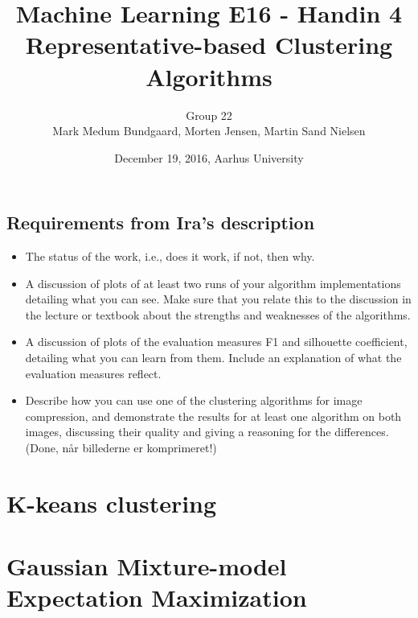 \documentclass[a4paper,10pt,article,oneside,english]{memoir}
\begin{document}
	\title{Machine Learning E16 - Handin 4\\
		Representative-based Clustering Algorithms}
	\author{Group 22\\
		Mark Medum Bundgaard, Morten Jensen, Martin Sand Nielsen}
	\date{December 19, 2016, Aarhus University}
	
	\mainmatter
	\maketitle


\subsection{Requirements from Ira's description}
\begin{itemize}
	\item The status of the work, i.e., does it work, if not, then why.
	\item A discussion of plots of at least two runs of your algorithm implementations detailing what you can see. Make sure that you relate this to the discussion in the lecture or textbook about the strengths and weaknesses of the algorithms.
	\item A discussion of plots of the evaluation measures F1 and silhouette coefficient, detailing what you can learn from them. Include an explanation of what the evaluation measures reflect.
	\item Describe how you can use one of the clustering algorithms for image compression, and demonstrate the results for at least one algorithm on both images, discussing their quality and giving a reasoning for the differences. (Done, når billederne er komprimeret!)
\end{itemize}

\section*{K-keans clustering}

\section*{Gaussian Mixture-model Expectation Maximization}
\end{document}

